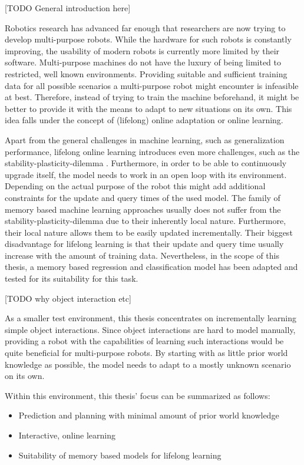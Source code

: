 [TODO General introduction here]

Robotics research has advanced far enough that researchers are now 
trying to develop multi-purpose robots. While the hardware for such robots
is constantly improving, the usability of modern robots is currently more
limited by their software. Multi-purpose machines do not have the luxury of 
being limited to restricted, well known environments. Providing suitable and
sufficient training data for all possible scenarios a multi-purpose robot
might encounter is infeasible at best. Therefore, instead of trying to train
the machine beforehand, it might be better to provide it with the means to
adapt to new situations on its own. This idea falls under the concept of 
(lifelong) online adaptation or online learning. 

Apart from the general challenges in machine learning, such as generalization 
performance, lifelong online learning introduces even more challenges, such as the 
stability-plasticity-dilemma \cite{stability-plasticity}. Furthermore, in order to be able to 
continuously upgrade itself, the model needs to work in an open loop with its environment. 
Depending on the actual purpose of the robot this might add additional constraints for the update 
and query times of the used model. %
The family of memory based machine learning approaches usually 
does not suffer from the stability-plasticity-dilemma due to their inherently local nature.  
Furthermore, their local nature allows them to be easily updated incrementally. Their biggest disadvantage for lifelong learning is that their update and query time usually increase with the amount of training data. Nevertheless, in the scope of this thesis, a memory based regression and classification model has been adapted and tested for its suitability for this task.

[TODO why object interaction etc]


As a smaller test environment, this thesis concentrates on incrementally learning simple object 
interactions. Since object interactions are hard to model manually, providing a robot with the 
capabilities of learning such interactions would be quite beneficial for multi-purpose robots.
By starting with as little prior world knowledge as possible, the model needs to adapt to a mostly 
unknown scenario on its own. 

Within this environment, this thesis' focus can be summarized as follows: 

\begin{itemize}
	\item Prediction and planning with minimal amount of prior world knowledge
	\item Interactive, online learning
	\item Suitability of memory based models for lifelong learning
\end{itemize}

